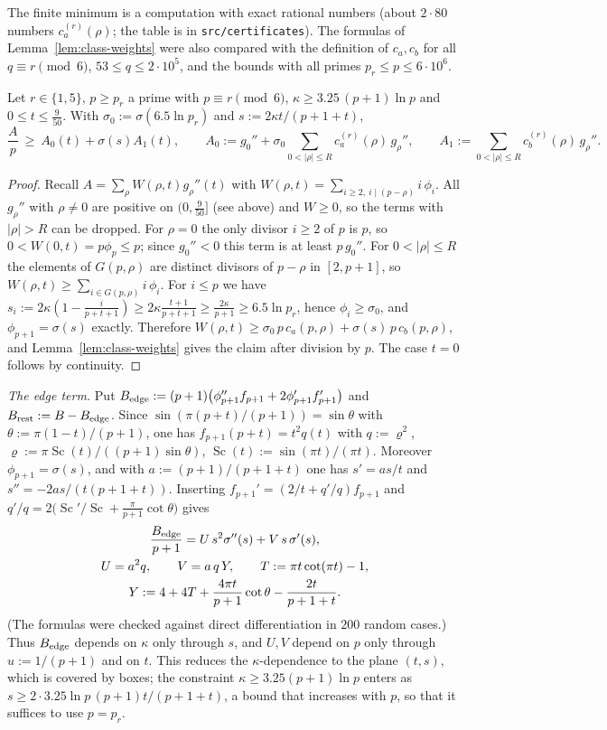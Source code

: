 The finite minimum is a computation with exact rational numbers (about $2\cdot80$ numbers $c_a^{(r)}(\rho)$; the table is in \texttt{src/certificates}). The formulas of Lemma~\ref{lem:class-weights} were also compared with the definition of $c_a,c_b$ for all $q\equiv r\pmod 6$, $53\le q\le2\cdot10^5$, and the bounds with all primes $p_r\le p\le6\cdot10^6$.

\begin{lemma}\label{lem:A-bound}
Let $r\in\{1,5\}$, $p\ge p_r$ a prime with $p\equiv r\pmod6$, $\kappa\ge3.25\,(p+1)\ln p$ and $0\le t\le\tfrac9{50}$. With $\sigma_0:=\sigma(6.5\ln p_r)$ and $s:=2\kappa t/(p+1+t)$,
\[
\frac Ap\ \ge\ A_0(t)+\sigma(s)A_1(t),\qquad
A_0:=g_0''+\sigma_0\!\!\sum_{0<|\rho|\le R}\!c_a^{(r)}(\rho)\,g_\rho'',\qquad
A_1:=\sum_{0<|\rho|\le R}\!c_b^{(r)}(\rho)\,g_\rho'' .
\]
\end{lemma}
\begin{proof}
Recall $A=\sum_\rho W(\rho,t)g_\rho''(t)$ with $W(\rho,t)=\sum_{i\ge2,\ i\mid(p-\rho)}i\,\phi_i$. All $g_\rho''$ with $\rho\ne0$ are positive on $(0,\tfrac9{50}]$ (see above) and $W\ge0$, so the terms with $|\rho|>R$ can be dropped. For $\rho=0$ the only divisor $i\ge2$ of $p$ is $p$, so $0<W(0,t)=p\phi_p\le p$; since $g_0''<0$ this term is at least $p\,g_0''$. For $0<|\rho|\le R$ the elements of $G(p,\rho)$ are distinct divisors of $p-\rho$ in $[2,p+1]$, so $W(\rho,t)\ge\sum_{i\in G(p,\rho)}i\,\phi_i$. For $i\le p$ we have $s_i:=2\kappa(1-\tfrac i{p+t+1})\ge2\kappa\tfrac{t+1}{p+t+1}\ge\tfrac{2\kappa}{p+1}\ge6.5\ln p_r$, hence $\phi_i\ge\sigma_0$, and $\phi_{p+1}=\sigma(s)$ exactly. Therefore $W(\rho,t)\ge\sigma_0\,p\,c_a(p,\rho)+\sigma(s)\,p\,c_b(p,\rho)$, and Lemma~\ref{lem:class-weights} gives the claim after division by $p$. The case $t=0$ follows by continuity.
\end{proof}

\emph{The edge term.} Put $B_{\rm edge}:=(p+1)\bigl(\phi_{p+1}''f_{p+1}+2\phi_{p+1}'f_{p+1}'\bigr)$ and $B_{\rm rest}:=B-B_{\rm edge}$. Since $\sin(\pi(p+t)/(p+1))=\sin\theta$ with $\theta:=\pi(1-t)/(p+1)$, one has $f_{p+1}(p+t)=t^2q(t)$ with $q:=\varrho^2$, $\varrho:=\pi\operatorname{Sc}(t)/((p+1)\sin\theta)$, $\operatorname{Sc}(t):=\sin(\pi t)/(\pi t)$. Moreover $\phi_{p+1}=\sigma(s)$, and with $a:=(p+1)/(p+1+t)$ one has $s'=as/t$ and $s''=-2as/(t(p+1+t))$. Inserting $f_{p+1}'=(2/t+q'/q)f_{p+1}$ and $q'/q=2\bigl(\operatorname{Sc}'/\operatorname{Sc}+\tfrac{\pi}{p+1}\cot\theta\bigr)$ gives
\begin{gather*}
\frac{B_{\rm edge}}{p+1}=U\,s^2\sigma''(s)+V\,s\,\sigma'(s),\\
U=a^2q,\qquad V=a\,q\,Y,\qquad T:=\pi t\cot(\pi t)-1,\\
Y:=4+4T+\frac{4\pi t}{p+1}\cot\theta-\frac{2t}{p+1+t}.
\end{gather*}
(The formulas were checked against direct differentiation in $200$ random cases.) Thus $B_{\rm edge}$ depends on $\kappa$ only through $s$, and $U,V$ depend on $p$ only through $u:=1/(p+1)$ and on $t$. This reduces the $\kappa$-dependence to the plane $(t,s)$, which is covered by boxes; the constraint $\kappa\ge3.25(p+1)\ln p$ enters as $s\ge2\cdot3.25\ln p\,(p+1)t/(p+1+t)$, a bound that increases with $p$, so that it suffices to use $p=p_r$.

